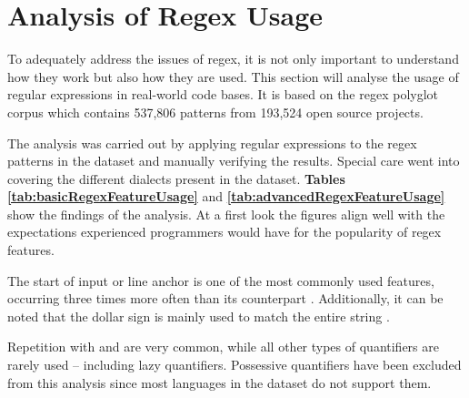 \section{Analysis of Regex Usage} \label{sec:analysisRegexUsage}

To adequately address the issues of regex, it is not only important to understand how they work but also how they are used. This section will analyse the usage of regular expressions in real-world code bases. It is based on the regex polyglot corpus \cite{RegexNotLinguaFranca} which contains 537,806 patterns from 193,524 open source projects.

The analysis was carried out by applying regular expressions to the regex patterns in the dataset and manually verifying the results. Special care went into covering the different dialects present in the dataset. \textbf{Tables \ref{tab:basicRegexFeatureUsage}} and \textbf{\ref{tab:advancedRegexFeatureUsage}} show the findings of the analysis. At a first look the figures align well with the expectations experienced programmers would have for the popularity of regex features. 

The start of input or line anchor \pattern{\caret} is one of the most commonly used features, occurring three times more often than its counterpart \pattern{\dollar}. Additionally, it can be noted that the dollar sign is mainly used to match the entire string \pattern{\caret\placeholder\dollar}.

Repetition with \pattern{*} and \pattern{+} are very common, while all other types of quantifiers are rarely used -- including lazy quantifiers. Possessive quantifiers have been excluded from this analysis since most languages in the dataset do not support them. 

